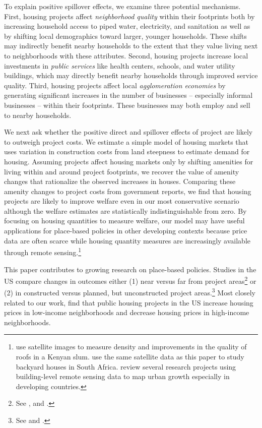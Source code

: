 \documentclass[12pt]{article}
\begin{document}
To explain positive spillover effects, we examine three potential mechanisms.  First, housing projects affect \textit{neighborhood quality} within their footprints both by increasing household access to piped water, electricity, and sanitation as well as by shifting local demographics toward larger, younger households.  These shifts may indirectly benefit nearby households to the extent that they value living next to neighborhoods with these attributes.  Second, housing projects increase local investments in \textit{public services} like health centers, schools, and water utility buildings, which may directly benefit nearby households through improved service quality.  Third, housing projects affect local \textit{agglomeration economies} by generating significant increases in the number of businesses -- especially informal businesses -- within their footprints.  These businesses may both employ and sell to nearby households.

We next ask whether the positive direct and spillover effects of project are likely to outweigh project costs.  We estimate a simple model of housing markets that uses variation in construction costs from land steepness to estimate demand for housing.  Assuming projects affect housing markets only by shifting amenities for living within and around project footprints, we recover the value of amenity changes that rationalize the observed increases in houses.  Comparing these amenity changes to project costs from government reports, we find that housing projects are likely to improve welfare even in our most conservative scenario although the welfare estimates are statistically indistinguishable from zero.  By focusing on housing quantities to measure welfare, our model may have useful applications for place-based policies in other developing contexts because price data are often scarce while housing quantity measures are increasingly available through remote sensing.\footnote{ \cite{marxthere} use satellite images to measure density and improvements in the quality of roofs in a Kenyan slum.  \cite{Brueckner2018backyarding} use the same satellite data as this paper to study backyard houses in South Africa. \cite{donaldson2016view} review several research projects using building-level remote sensing data to map urban growth especially in developing countries. }  


 
This paper contributes to growing research on place-based policies.  Studies in the US compare changes in outcomes either (1) near versus far from project areas\footnote{See \cite{rossi2010housing,hornbeck2017creative}, and \cite{diamond2016wants}.} or (2) in constructed versus planned, but unconstructed project areas.\footnote{See \cite{busso2013assessing} and \cite{kline2013local}.}  Most closely related to our work, \cite{diamond2016wants} find that public housing projects in the US increase housing prices in low-income neighborhoods and decrease housing prices in high-income neighborhoods.  
\end{document}

